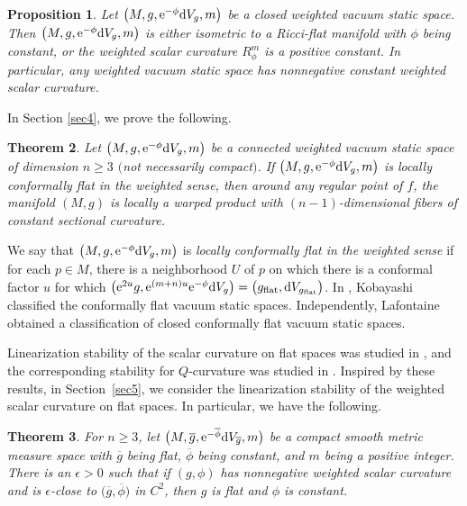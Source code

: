 \documentclass[10pt,a4paper]{amsart}
\numberwithin{equation}{section}
\newtheorem{Theorem}{Theorem}[section]
\newtheorem{Proposition}[Theorem]{Proposition}
 { \theoremstyle{definition}
\newtheorem{Definition}[Theorem]{Definition}
\newtheorem{Note}[Theorem]{Note}
\newtheorem{Example}[Theorem]{Example}
\newtheorem{Remark}[Theorem]{Remark} }
\begin{document}
\begin{Proposition}\label{propRneg}
 Let $\bigl(M,g,{\rm e}^{-\phi}{\rm d}V_g,m\bigr)$ be a closed weighted vacuum static space. Then $\bigl(M,g,\allowbreak {\rm e}^{-\phi}{\rm d}V_g,m\bigr)$ is either isometric to a Ricci-flat manifold with $\phi$
 being constant, or the weighted scalar curvature $R_\phi^m$ is a positive constant.
 In particular, any weighted vacuum static space has nonnegative constant weighted scalar curvature.
\end{Proposition}

In Section \ref{sec4}, we prove the following.


\begin{Theorem}\label{thm1.1}
 Let $\bigl(M,g,{\rm e}^{-\phi}{\rm d}V_g,m\bigr)$ be a connected weighted vacuum static space of dimension $n\geq3$ $($not necessarily compact$)$. If $\bigl(M,g,{\rm e}^{-\phi}{\rm d}V_g,m\bigr)$ is locally conformally flat in the weighted sense, then around any regular point of $f$, the manifold $(M,g)$ is locally a warped product with $(n-1)$-dimensional fibers of constant sectional curvature.
 \end{Theorem}

We say that $\bigl(M,g,{\rm e}^{-\phi}{\rm d}V_g,m\bigr)$ is \textit{locally conformally flat in the weighted sense} if for each $p\in M$, there is a neighborhood $U$ of $p$ on which there is a conformal factor $u$ for which $\bigl({\rm e}^{2u}g,{\rm e}^{(m+n)u}{\rm e}^{-\phi}{\rm d}V_g\bigr)=\bigl(g_{\rm flat},{\rm d}V_{g_{\rm flat}}\bigr)$. In \cite{Kobayashi}, Kobayashi classified the conformally flat vacuum static spaces. Independently, Lafontaine \cite{Lafontaine} obtained a classification of closed conformally flat vacuum static spaces.

 Linearization stability of the scalar curvature on flat spaces was studied in \cite{Fischer&Marsden},
 and the corresponding stability for $Q$-curvature was studied in \cite{Lin&Yuan}.
 Inspired by these results, in Section~\ref{sec5}, we consider the linearization stability of the weighted scalar curvature on flat spaces. In particular, we have the following.

\begin{Theorem}\label{rigidity}
 For $n\geq3$, let $\bigl(M,\overline{g},{\rm e}^{-\overline{\phi}}{\rm d}V_{\overline{g}},m\bigr)$ be a compact smooth metric measure space with
 $\overline{g}$ being flat, $\overline{\phi}$ being constant, and $m$ being a positive integer.
 There is an $\epsilon>0$ such that if $(g,\phi)$ has nonnegative weighted scalar curvature and is $\epsilon$-close to $\bigl(\overline{g},\overline{\phi}\bigr)$ in $C^2$, then $g$ is flat and $\phi$ is constant.
\end{Theorem}
\end{document}
